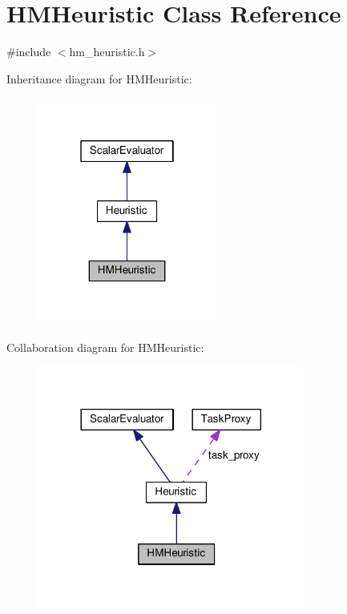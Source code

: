 \hypertarget{classHMHeuristic}{\section{H\-M\-Heuristic Class Reference}
\label{classHMHeuristic}
}


{\ttfamily \#include $<$hm\-\_\-heuristic.\-h$>$}



Inheritance diagram for H\-M\-Heuristic\-:
\nopagebreak
\begin{figure}[H]
\begin{center}
\leavevmode
\includegraphics[width=166pt]{classHMHeuristic__inherit__graph}
\end{center}
\end{figure}


Collaboration diagram for H\-M\-Heuristic\-:
\nopagebreak
\begin{figure}[H]
\begin{center}
\leavevmode
\includegraphics[width=248pt]{classHMHeuristic__coll__graph}
\end{center}
\end{figure}
